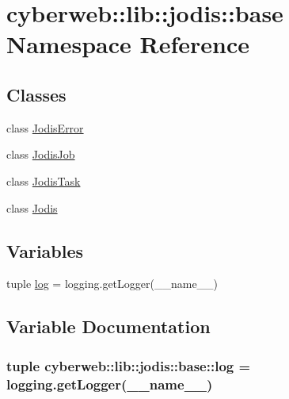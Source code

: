 \hypertarget{namespacecyberweb_1_1lib_1_1jodis_1_1base}{\section{cyberweb\-:\-:lib\-:\-:jodis\-:\-:base \-Namespace \-Reference}
\label{namespacecyberweb_1_1lib_1_1jodis_1_1base}
}
\subsection*{\-Classes}
\begin{DoxyCompactItemize}
\item 
class \hyperlink{classcyberweb_1_1lib_1_1jodis_1_1base_1_1_jodis_error}{\-Jodis\-Error}
\item 
class \hyperlink{classcyberweb_1_1lib_1_1jodis_1_1base_1_1_jodis_job}{\-Jodis\-Job}
\item 
class \hyperlink{classcyberweb_1_1lib_1_1jodis_1_1base_1_1_jodis_task}{\-Jodis\-Task}
\item 
class \hyperlink{classcyberweb_1_1lib_1_1jodis_1_1base_1_1_jodis}{\-Jodis}
\end{DoxyCompactItemize}
\subsection*{\-Variables}
\begin{DoxyCompactItemize}
\item 
tuple \hyperlink{namespacecyberweb_1_1lib_1_1jodis_1_1base_a1952395431271f2ccad1c6c64db0d7c9}{log} = logging.\-get\-Logger(\-\_\-\-\_\-name\-\_\-\-\_\-)
\end{DoxyCompactItemize}


\subsection{\-Variable \-Documentation}
\hypertarget{namespacecyberweb_1_1lib_1_1jodis_1_1base_a1952395431271f2ccad1c6c64db0d7c9}{
\subsubsection[{log}]{\setlength{\rightskip}{0pt plus 5cm}tuple {\bf cyberweb\-::lib\-::jodis\-::base\-::log} = logging.\-get\-Logger(\-\_\-\-\_\-name\-\_\-\-\_\-)}}\label{namespacecyberweb_1_1lib_1_1jodis_1_1base_a1952395431271f2ccad1c6c64db0d7c9}
